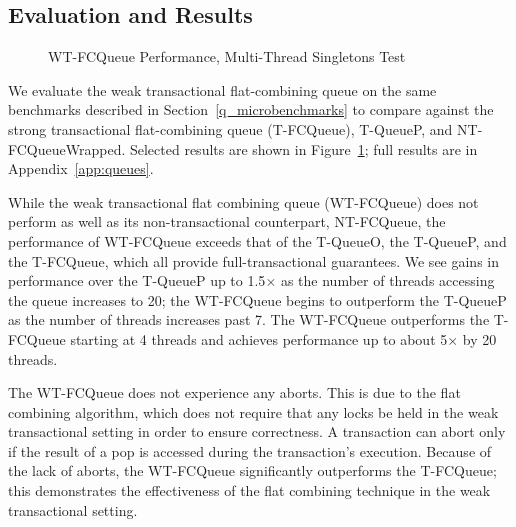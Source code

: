 \subsection{Evaluation and Results}

\begin{figure}[t]
    \centering
    \caption{WT-FCQueue Performance, Multi-Thread Singletons Test}
    \label{fig:wtqs}
\end{figure}

We evaluate the weak transactional flat-combining queue on the same benchmarks described in Section~\ref{q_microbenchmarks} to compare against the strong transactional flat-combining queue (T-FCQueue), T-QueueP, and NT-FCQueueWrapped. Selected results are shown in Figure~\ref{fig:wtqs}; full results are in Appendix~\ref{app:queues}. 

While the weak transactional flat combining queue (WT-FCQueue) does not perform as well as its non-transactional counterpart, NT-FCQueue, the performance of WT-FCQueue exceeds that of the T-QueueO, the T-QueueP, and the T-FCQueue, which all provide full-transactional guarantees. We see gains in performance over the T-QueueP up to 1.5$\times$ as the number of threads accessing the queue increases to 20; the WT-FCQueue begins to outperform the T-QueueP as the number of threads increases past 7. The WT-FCQueue outperforms the T-FCQueue starting at 4 threads and achieves performance up to about 5$\times$ by 20 threads.
 
The WT-FCQueue does not experience any aborts. This is due to the flat combining algorithm, which does not require that any locks be held in the weak transactional setting in order to ensure correctness. A transaction can abort only if the result of a pop is accessed during the transaction's execution.
Because of the lack of aborts, the WT-FCQueue significantly outperforms the T-FCQueue; this demonstrates the effectiveness of the flat combining technique in the weak transactional setting. 

